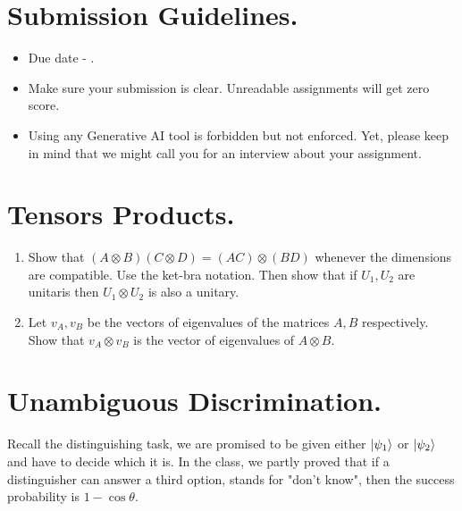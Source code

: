 \newcommand{\qCircEx}[4]{\begin{figure*}[h!]
    \centering
    \subqCircEx{#1}{#2}
    ~ 
    \subqCircEx{#3}{#4}
\end{figure*}
}

\newcommand{\qCircExfullline}[2]{\begin{figure*}[h!]
    \stepcounter{enumcirc} \caption*{ (\alph{enumcirc}) #1}
        \centering 
        #2
\end{figure*}
}



\section{Submission Guidelines.}
\begin{itemize}
    \item Due date - \advanceday. 
    \item Make sure your submission is clear. Unreadable assignments will get zero score.  
    \item Using any Generative AI tool is forbidden but not enforced. Yet, please keep in mind that we might call you for an interview about your assignment. 
\end{itemize}

\newpage

\section{Tensors Products.}
\begin{enumerate}
    \item Show that $(A \otimes B)(C \otimes D) = (AC) \otimes (BD)$ whenever the dimensions are compatible. Use the ket-bra notation. Then show that if $U_1, U_2$ are unitaris then $U_1 \otimes U_2$ is also a unitary. 
    
    \item Let $v_A, v_B$ be the vectors of eigenvalues of the matrices $A,B$ respectively. Show that $v_A \otimes v_B$ is the vector of eigenvalues of $A \otimes B$.
    
\end{enumerate}


\section{Unambiguous Discrimination.}
Recall the distinguishing task, we are promised to be given either $\ket{\psi_{1}}$ or $\ket{\psi_{2}}$ and have to decide which it is. In the class, we partly proved that if a distinguisher can answer a third option, stands for "don't know", then the success probability is $ 1 - \cos\theta$. 

